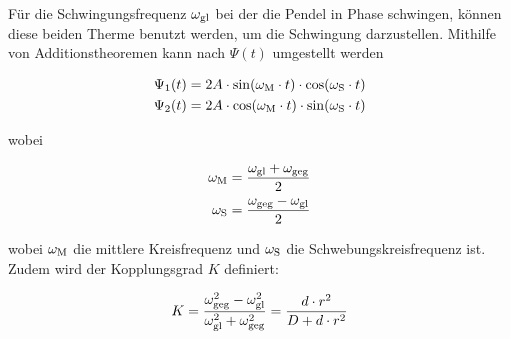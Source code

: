 Für die Schwingungsfrequenz $\omega_{\mathrm{gl}}$ bei der die Pendel in Phase schwingen, können diese beiden Therme benutzt werden, um die Schwingung darzustellen. Mithilfe von Additionstheoremen kann nach $\Psi(t)$ umgestellt werden

\begin{align}
\Psi_1 (t) &= 2A \cdot \sin (\omega_{\mathrm{M}} \cdot t) \cdot \cos (\omega_{\mathrm{S}} \cdot t)	\label{eq:psi1} \\
\Psi_2 (t) &= 2A \cdot \cos (\omega_{\mathrm{M}} \cdot t) \cdot \sin (\omega_{\mathrm{S}} \cdot t)	\label{eq:psi2}
\end{align}

wobei

\begin{align}
\omega_{\mathrm{M}} &= \frac{\omega_{\mathrm{gl}} + \omega_{\mathrm{geg}}}{2}	\label{eq:avg} \\
\omega_{\mathrm{S}} &= \frac{\omega_{\mathrm{geg}} - \omega_{\mathrm{gl}}}{2}	\label{eq:schwebung}
\end{align}

wobei $\omega_{\mathrm{M}}$ die mittlere Kreisfrequenz und $\omega_{\mathrm{S}}$ die Schwebungskreisfrequenz ist.\\
Zudem wird der Kopplungsgrad $K$ definiert:

\begin{equation}
K = \frac{\omega_{\mathrm{geg}}^2 - \omega_{\mathrm{gl}}^2}{\omega_{\mathrm{gl}}^2 + \omega_{\mathrm{geg}}^2} = \frac{d \cdot r^2}{D + d \cdot r^2}	\label{eq:kopplung}
\end{equation}






